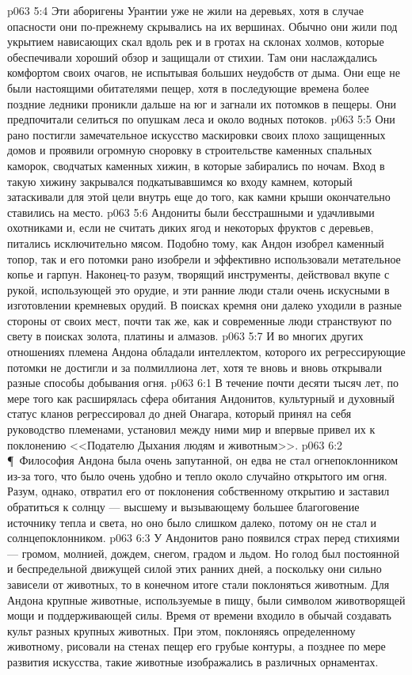 \vs p063 5:4 Эти аборигены Урантии уже не жили на деревьях, хотя в случае опасности они по\hyp{}прежнему скрывались на их вершинах. Обычно они жили под укрытием нависающих скал вдоль рек и в гротах на склонах холмов, которые обеспечивали хороший обзор и защищали от стихии. Там они наслаждались комфортом своих очагов, не испытывая больших неудобств от дыма. Они еще не были настоящими обитателями пещер, хотя в последующие времена более поздние ледники проникли дальше на юг и загнали их потомков в пещеры. Они предпочитали селиться по опушкам леса и около водных потоков.
\vs p063 5:5 Они рано постигли замечательное искусство маскировки своих плохо защищенных домов и проявили огромную сноровку в строительстве каменных спальных каморок, сводчатых каменных хижин, в которые забирались по ночам. Вход в такую хижину закрывался подкатывавшимся ко входу камнем, который затаскивали для этой цели внутрь еще до того, как камни крыши окончательно ставились на место.
\vs p063 5:6 Андониты были бесстрашными и удачливыми охотниками и, если не считать диких ягод и некоторых фруктов с деревьев, питались исключительно мясом. Подобно тому, как Андон изобрел каменный топор, так и его потомки рано изобрели и эффективно использовали метательное копье и гарпун. Наконец\hyp{}то разум, творящий инструменты, действовал вкупе с рукой, использующей это орудие, и эти ранние люди стали очень искусными в изготовлении кремневых орудий. В поисках кремня они далеко уходили в разные стороны от своих мест, почти так же, как и современные люди странствуют по свету в поисках золота, платины и алмазов.
\vs p063 5:7 И во многих других отношениях племена Андона обладали интеллектом, которого их регрессирующие потомки не достигли и за полмиллиона лет, хотя те вновь и вновь открывали разные способы добывания огня.
\vs p063 6:1 В течение почти десяти тысяч лет, по мере того как расширялась сфера обитания Андонитов, культурный и духовный статус кланов регрессировал до дней Онагара, который принял на себя руководство племенами, установил между ними мир и впервые привел их к поклонению <<Подателю Дыхания людям и животным>>.
\vs p063 6:2 \P\ Философия Андона была очень запутанной, он едва не стал огнепоклонником из\hyp{}за того, что было очень удобно и тепло около случайно открытого им огня. Разум, однако, отвратил его от поклонения собственному открытию и заставил обратиться к солнцу --- высшему и вызывающему большее благоговение источнику тепла и света, но оно было слишком далеко, потому он не стал и солнцепоклонником.
\vs p063 6:3 У Андонитов рано появился страх перед стихиями --- громом, молнией, дождем, снегом, градом и льдом. Но голод был постоянной и беспредельной движущей силой этих ранних дней, а поскольку они сильно зависели от животных, то в конечном итоге стали поклоняться животным. Для Андона крупные животные, используемые в пищу, были символом животворящей мощи и поддерживающей силы. Время от времени входило в обычай создавать культ разных крупных животных. При этом, поклоняясь определенному животному, рисовали на стенах пещер его грубые контуры, а позднее по мере развития искусства, такие животные изображались в различных орнаментах.
